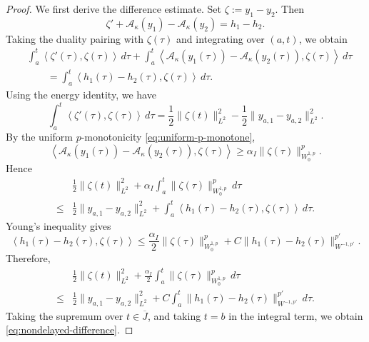 \documentclass[a4paper,11pt,oneside,reqno]{amsart}
\newcounter{c}
\newcounter{d}
\newcounter{b}
\newcommand{\dual}[2]{\left\langle #1,#2\right\rangle}
\begin{document}
\begin{proof}
We first derive the difference estimate.  Set $ \zeta:=y_1-y_2 $.
Then
\[
 \zeta'
 +\mathcal A_\kappa(y_1)-\mathcal A_\kappa(y_2)
 =
 h_1-h_2 .
\]
Taking the duality pairing with \(\zeta(\tau)\) and integrating over
\((a,t)\), we obtain
\[
\begin{aligned}
 &\int_a^t\dual{\zeta'(\tau)}{\zeta(\tau)}\,d\tau
 +\int_a^t
 \dual{\mathcal A_\kappa(y_1(\tau))-\mathcal A_\kappa(y_2(\tau))}
       {\zeta(\tau)}
 \,d\tau \\
 &\qquad=
 \int_a^t\dual{h_1(\tau)-h_2(\tau)}{\zeta(\tau)}\,d\tau .
\end{aligned}
\]
Using the energy identity, we have
\[
 \int_a^t\dual{\zeta'(\tau)}{\zeta(\tau)}\,d\tau
 =
 \frac12\|\zeta(t)\|_{L^2}^2
 -\frac12\|y_{a,1}-y_{a,2}\|_{L^2}^2 .
\]
By the uniform \(p\)-monotonicity \eqref{eq:uniform-p-monotone},
\[
 \dual{\mathcal A_\kappa(y_1(\tau))-\mathcal A_\kappa(y_2(\tau))}
       {\zeta(\tau)}
 \ge
 \alpha_I\|\zeta(\tau)\|_{W^{1,p}_0}^p .
\]
Hence
\[
\begin{aligned}
 &\frac12\|\zeta(t)\|_{L^2}^2
 +\alpha_I\int_a^t\|\zeta(\tau)\|_{W^{1,p}_0}^p\,d\tau \\
\le{}&
 \frac12\|y_{a,1}-y_{a,2}\|_{L^2}^2 
 +\int_a^t\dual{h_1(\tau)-h_2(\tau)}{\zeta(\tau)}\,d\tau .
\end{aligned}
\]
Young's inequality gives
\[
 \dual{h_1(\tau)-h_2(\tau)}{\zeta(\tau)}
 \le
 \frac{\alpha_I}{2}\|\zeta(\tau)\|_{W^{1,p}_0}^p
 +C\|h_1(\tau)-h_2(\tau)\|_{W^{-1,p'}}^{p'} .
\]
Therefore,
\[
\begin{aligned}
 &\frac12\|\zeta(t)\|_{L^2}^2
 +\frac{\alpha_I}{2}
 \int_a^t\|\zeta(\tau)\|_{W^{1,p}_0}^p\,d\tau \\
 \le{} &
 \frac12\|y_{a,1}-y_{a,2}\|_{L^2}^2
 +C\int_a^t
 \|h_1(\tau)-h_2(\tau)\|_{W^{-1,p'}}^{p'}\,d\tau .
\end{aligned}
\]
Taking the supremum over \(t\in\overline J\), and taking \(t=b\) in the
integral term, we obtain \eqref{eq:nondelayed-difference}.


\end{proof}
\end{document}
